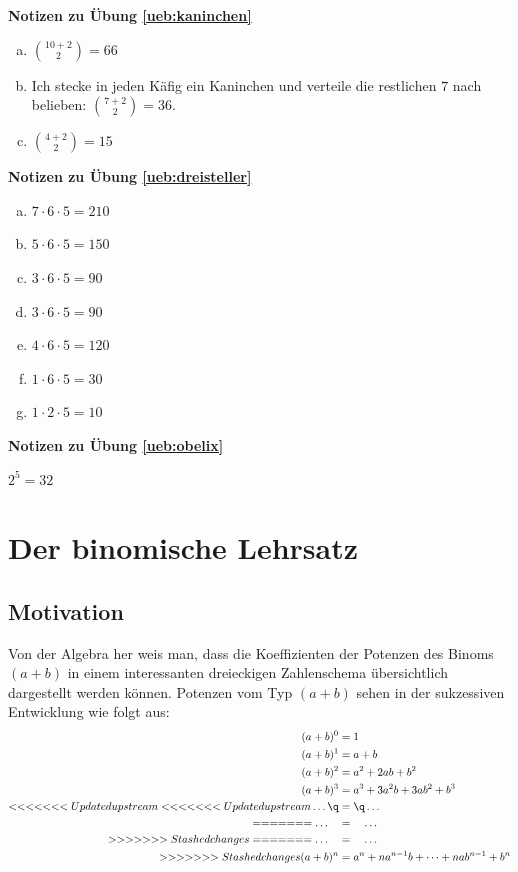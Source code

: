 \documentclass[%
<<<<<<< Updated upstream
<<<<<<< Updated upstream
11pt,%
twoside,%
titlepage,%
german,%
=======
=======
>>>>>>> Stashed changes
11pt,%
twoside,%
titlepage,%
swissgerman,%
<<<<<<< Updated upstream
>>>>>>> Stashed changes
=======
>>>>>>> Stashed changes
headsepline%
]{scrartcl}
\newcommand{\faReturnGray}{\textcolor{gray}{\faMailReply}} %
\theoremstyle{definition}
\theoremstyle{plain}
\newcommand{\concatueb}[1]{ueb:#1}%
\newcommand{\concatlsg}[1]{lsg:#1}%
\newenvironment{lsg}[1]{%
    \par\noindent\textbf{Notizen zu Übung \ref{\concatueb{#1}}}\label{\concatlsg{#1}}
    \hfill\hyperref[\concatueb{#1}]{\faReturnGray}\par %
}{%
    \par%
}
\newcommand{\concatueb}[1]{ueb:#1}%
\newcommand{\concatlsg}[1]{lsg:#1}%
\newenvironment{lsg}[1]{%
    \par\noindent\textbf{Notizen zu Übung \ref{\concatueb{#1}}.}%
    \label{\concatlsg{#1}}
}{%
    \par%
}
\begin{document}
\begin{lsg}{kaninchen}
\begin{enumerate}[a)]
\item $\binom{10+2}{2}=66$
\item Ich stecke in jeden K\"afig ein Kaninchen und verteile die restlichen $7$ nach belieben: $\binom{7+2}{2}=36$.
\item $\binom{4+2}{2}=15$
\end{enumerate}
\end{lsg}
\begin{lsg}{dreisteller}
\begin{enumerate}[a)]
\item $7\cdot6\cdot5=210$
\item $5\cdot6\cdot5=150$
\item $3\cdot6\cdot5=90$
\item $3\cdot6\cdot5=90$
\item $4\cdot6\cdot5=120$
\item $1\cdot6\cdot5=30$
\item $1\cdot2\cdot5=10$
\end{enumerate}
\end{lsg}
\begin{lsg}{obelix}
$2^{5}=32$
\end{lsg}

\clearpage

\section{Der binomische Lehrsatz} \label{app:binomial}

\subsection{Motivation}

Von der Algebra her weis man, dass die Koeffizienten der Potenzen des Binoms $(a+b)$ in einem interessanten dreieckigen Zahlenschema übersichtlich dargestellt werden können.
Potenzen vom Typ $(a+b)$ sehen in der sukzessiven Entwicklung wie folgt aus:
\begin{align*}
(a+b)^0&=1\\
(a+b)^1&=a+b\\
(a+b)^2&=a^2+2ab+b^2\\
(a+b)^3&=a^3+3a^2b+3ab^2+b^3\\
<<<<<<< Updated upstream
<<<<<<< Updated upstream
\dots\q &= \q\dots\\
=======
\dots\quad &= \quad\dots\\
>>>>>>> Stashed changes
=======
\dots\quad &= \quad\dots\\
>>>>>>> Stashed changes
(a+b)^n&=a^n+na^{n-1}b+\dots+nab^{n-1}+b^n
\end{align*}
\end{document}
